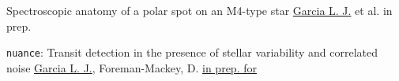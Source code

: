     {Spectroscopic anatomy of a polar spot on an M4-type star}
    {\underline{Garcia L. J.} et al.}
    {in prep.}

    {\texttt{nuance}: Transit detection in the presence of stellar variability and correlated noise}
    {\underline{Garcia L. J.}, Foreman-Mackey, D.}
    {\href{https://github.com/lgrcia/paper-nuance/blob/main/latex/ms.pdf}{in prep. for \aap}}
